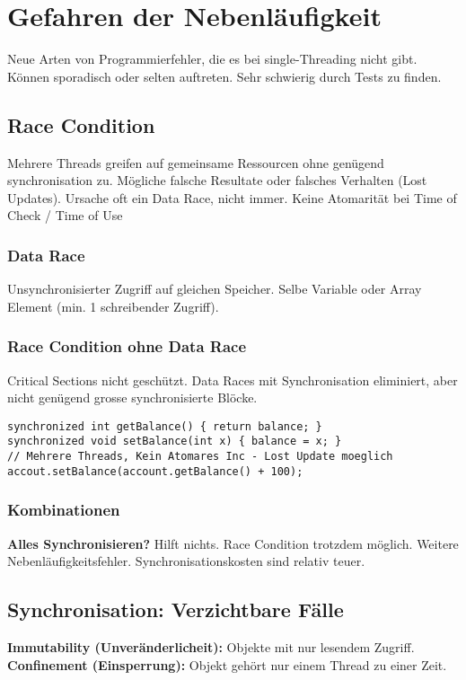 \section{Gefahren der Nebenläufigkeit}
Neue Arten von Programmierfehler, die es bei single-Threading nicht gibt. 
Können sporadisch oder selten auftreten.
Sehr schwierig durch Tests zu finden.

\subsection{Race Condition}
Mehrere Threads greifen auf gemeinsame Ressourcen ohne genügend synchronisation zu.
Mögliche falsche Resultate oder falsches Verhalten (Lost Updates).
Ursache oft ein Data Race, nicht immer.
Keine Atomarität bei Time of Check / Time of Use

\subsubsection{Data Race}
Unsynchronisierter Zugriff auf gleichen Speicher.
Selbe Variable oder Array Element (min. 1 schreibender Zugriff).

\subsubsection{Race Condition ohne Data Race}
Critical Sections nicht geschützt. 
Data Races mit Synchronisation eliminiert, aber nicht genügend grosse synchronisierte Blöcke.
\begin{lstlisting}
synchronized int getBalance() { return balance; }
synchronized void setBalance(int x) { balance = x; }
// Mehrere Threads, Kein Atomares Inc - Lost Update moeglich 
accout.setBalance(account.getBalance() + 100);
\end{lstlisting}

\subsubsection{Kombinationen}
\textbf{Alles Synchronisieren?} Hilft nichts. Race Condition trotzdem möglich. Weitere Nebenläufigkeitsfehler.
Synchronisationskosten sind relativ teuer.

\subsection{Synchronisation: Verzichtbare Fälle}
\textbf{Immutability (Unveränderlicheit):} Objekte mit nur lesendem Zugriff.
\textbf{Confinement (Einsperrung):} Objekt gehört nur einem Thread zu einer Zeit.

